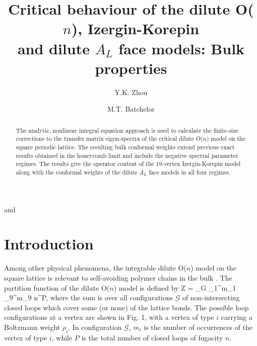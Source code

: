 \begin{frontmatter}
\title{Critical behaviour of the dilute O($n$), Izergin-Korepin\\
and dilute $A_L$ face models: Bulk properties}

\author{Y.K. Zhou} and 
\author{M.T. Batchelor}
\address{Department of Mathematics, School of Mathematical
Sciences,\\ The Australian National University, Canberra ACT 0200,
Australia}


\begin{abstract}
The analytic, nonlinear integral equation approach is 
used to calculate the finite-size corrections to the transfer 
matrix eigen-spectra of the critical dilute O($n$) model on 
the square periodic lattice. The resulting bulk conformal 
weights extend previous exact results obtained in the 
honeycomb limit and include the negative spectral parameter regimes. The
results give the operator content of the 19-vertex Izergin-Korepin model
along with the conformal weights of the dilute
$A_L$ face models in all four regimes.

\end{abstract}

\end{frontmatter}

\section{Introduction}
\setcounter{equation}{0}

Among other physical phenomena, 
the integrable dilute O($n$) model on the square lattice 
\cite{N:90a} is relevant to self-avoiding polymer chains in the 
bulk \cite{N:90b,N:90c}.
The partition function of the dilute O($n$) model is defined 
by \cite{N:90a,WN:93}  
\beq
Z = \sum_{{\mathcal G}} \rho_1^{m_1} \cdots \rho_9^{m_9} \; n^{P},
\label{Z}
\eeq
where the sum is over all configurations 
${\mathcal G}$ of non-intersecting closed
loops which cover some (or none) of the lattice bonds.
The possible loop configurations at a vertex are 
shown in Fig. 1, with a vertex of type
$i$ carrying a Boltzmann weight $\rho_i$. 
In configuration ${\mathcal G}$,
$m_i$ is the number of occurrences of the 
vertex of type $i$, while $P$ is the
total number of closed loops of fugacity $n$.

